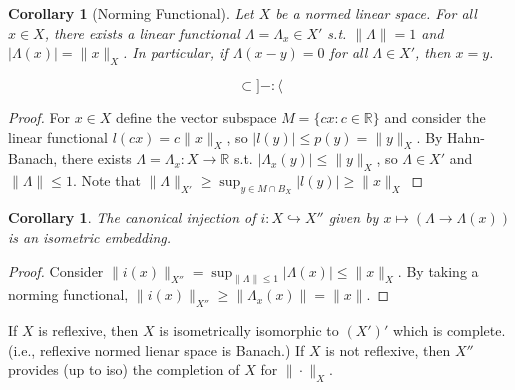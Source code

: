 \documentclass{article}
\theoremstyle{definition}
\theoremstyle{remark}
\theoremstyle{plain}
\newtheorem{crly}[defn]{Corollary}
\newcommand{\RR}{\mathbb{R}}
\begin{document}
\begin{crly}[Norming Functional]
    Let $X$ be a normed linear space. For all $x\in X$, there exists a linear functional $\Lambda=\Lambda_x\in X'$ s.t. $\|\Lambda\|=1$ and $|\Lambda(x)|=\|x\|_X$. In particular, if $\Lambda(x-y)=0$ for all $\Lambda\in X'$, then $x=y$.
\end{crly}
\[\subset]-:\langle\tag{Owen's (infinitely handsome) signature}\]
\begin{proof}
    For $x\in X$ define the vector subspace $M=\{cx:c\in\RR\}$ and consider the linear functional $l(cx)=c\|x\|_X$, so $|l(y)|\le p(y)=\|y\|_X$. By Hahn-Banach, there exists $\Lambda=\Lambda_x:X\to\RR$ s.t. $|\Lambda_x(y)|\le\|y\|_X$, so $\Lambda\in X'$ and $\|\Lambda\|\le 1$. Note that $\|\Lambda\|_{X'}\ge \sup_{y\in M\cap B_X}|l(y)|\ge \|x\|_X$
\end{proof}
\begin{crly}
    The canonical injection of $i:X\hookrightarrow X''$ given by $x\mapsto(\Lambda\to\Lambda(x))$ is an isometric embedding.
\end{crly}
\begin{proof}
    Consider $\|i(x)\|_{X''}=\sup_{\|\Lambda\|\le 1}|\Lambda(x)|\le\|x\|_X$. By taking a norming functional, $\|i(x)\|_{X''}\ge\|\Lambda_x(x)\|=\|x\|$.
\end{proof}
If $X$ is reflexive, then $X$ is isometrically isomorphic to $(X')'$ which is complete. (i.e., reflexive normed lienar space is Banach.)
If $X$ is not reflexive, then $X''$ provides (up to iso) the completion of $X$ for $\|\cdot\|_X$.
\end{document}
